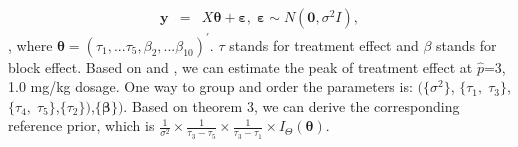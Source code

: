 \documentclass[Proceedings]{ascelike}
\begin{document}
\begin{eqnarray}
  \pmb{y}
    & = &
X\pmb{\theta}+\pmb{\varepsilon},\; \pmb{\varepsilon}{\sim}N(\pmb{0},\sigma^2 I),
\nonumber
\end{eqnarray}
, where ${\boldsymbol\theta}=(\tau_1,...\tau_5,\beta_2,...\beta_{10})^\prime$. $\tau$ stands for treatment effect and $\beta$ stands for block effect.
Based on \cite{Mack1981} and \cite{Lim1997}, we can estimate the peak of treatment effect at $\hat{p}$=3, 1.0 mg/kg dosage. One way to group and order the parameters is:
$(\{\sigma^2\}$, $\{\tau_1,\;\tau_3\}$, $\{\tau_4,\; \tau_5\}$,$\{\tau_2\})$,$\{\boldsymbol\beta\})$. Based on theorem 3, we can derive the corresponding reference prior, which is $\frac{1}{\sigma^2} \times \frac{1}{\tau_3-\tau_5} \times \frac{1}{\tau_3-\tau_1}\times I_{\Theta}(\boldsymbol{\theta})$.
\end{document}
